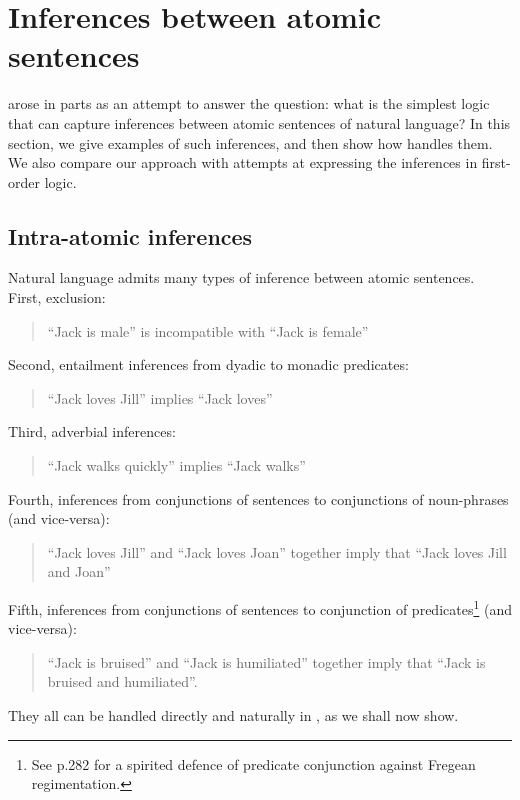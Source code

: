 
\section{Inferences between atomic sentences}\label{naturalLanguageInference}

\NI \Cathoristic{} arose in parts as an attempt to answer the
question: what is the simplest logic that can capture inferences
between atomic sentences of natural language?  In this section, we
give examples of such inferences, and then show how \cathoristic{}
handles them.  We also compare our approach with attempts at
expressing the inferences in first-order logic.

\subsection{Intra-atomic inferences}

\NI Natural language admits many types of inference between atomic
sentences.  First, exclusion:
\begin{quote}
``Jack is male'' is incompatible with ``Jack is female''
\end{quote}
Second, entailment inferences from dyadic to monadic predicates:
\begin{quote}
``Jack loves Jill'' implies ``Jack loves''
\end{quote}
Third, adverbial inferences:
\begin{quote}
``Jack walks quickly'' implies ``Jack walks''
\end{quote}
Fourth, inferences from conjunctions of sentences to conjunctions of noun-phrases (and vice-versa):
\begin{quote}
``Jack loves Jill'' and ``Jack loves Joan'' together imply that ``Jack loves Jill and Joan''
\end{quote}
Fifth, inferences from conjunctions of sentences to conjunction of predicates\footnote{See \cite{sommers} p.282 for a spirited defence of predicate conjunction against Fregean regimentation.} (and vice-versa):
\begin{quote}
``Jack is bruised'' and ``Jack is humiliated'' together imply that ``Jack is bruised and humiliated''.
\end{quote}

\NI They all can be handled directly and naturally in \cathoristic{}, as we
shall now show.

